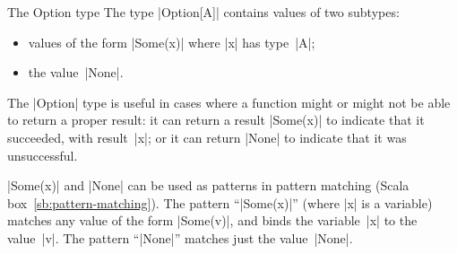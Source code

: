 \begin{scalaBox}{The {\scalashape Option} type}
\label{sb:option-type}
The type |Option[A]| contains values of two subtypes:
%
\begin{itemize}
\item values of the form |Some(x)| where |x| has type~|A|;

\item the value~|None|.
\end{itemize}

The |Option| type is useful in cases where a function might or might not be
able to return a proper result: it can return a result |Some(x)| to indicate
that it succeeded, with result~|x|; or it can return |None| to indicate that
it was unsuccessful.

|Some(x)| and |None| can be used as patterns in pattern matching (Scala
box~\ref{sb:pattern-matching}).  The pattern ``|Some(x)|'' (where |x| is a
variable) matches any value of the form |Some(v)|, and binds the variable~|x|
to the value~|v|.  The pattern ``|None|'' matches just the value~|None|.
\end{scalaBox}









